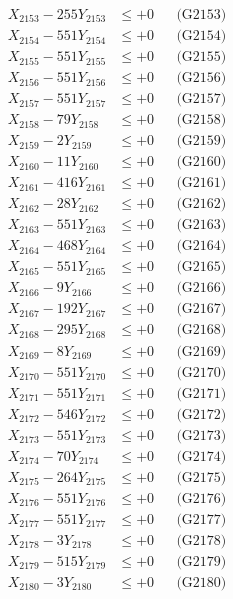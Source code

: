 \documentclass[a4paper,10pt]{article}
\begin{document}
{\begin{align}
X_{2153} - 255Y_{2153} &\leq +0 && \text{(G2153)} \\
X_{2154} - 551Y_{2154} &\leq +0 && \text{(G2154)} \\
X_{2155} - 551Y_{2155} &\leq +0 && \text{(G2155)} \\
X_{2156} - 551Y_{2156} &\leq +0 && \text{(G2156)} \\
X_{2157} - 551Y_{2157} &\leq +0 && \text{(G2157)} \\
X_{2158} - 79Y_{2158} &\leq +0 && \text{(G2158)} \\
X_{2159} - 2Y_{2159} &\leq +0 && \text{(G2159)} \\
X_{2160} - 11Y_{2160} &\leq +0 && \text{(G2160)} \\
\allowbreak
X_{2161} - 416Y_{2161} &\leq +0 && \text{(G2161)} \\
X_{2162} - 28Y_{2162} &\leq +0 && \text{(G2162)} \\
X_{2163} - 551Y_{2163} &\leq +0 && \text{(G2163)} \\
X_{2164} - 468Y_{2164} &\leq +0 && \text{(G2164)} \\
X_{2165} - 551Y_{2165} &\leq +0 && \text{(G2165)} \\
X_{2166} - 9Y_{2166} &\leq +0 && \text{(G2166)} \\
X_{2167} - 192Y_{2167} &\leq +0 && \text{(G2167)} \\
X_{2168} - 295Y_{2168} &\leq +0 && \text{(G2168)} \\
X_{2169} - 8Y_{2169} &\leq +0 && \text{(G2169)} \\
X_{2170} - 551Y_{2170} &\leq +0 && \text{(G2170)} \\
\allowbreak
X_{2171} - 551Y_{2171} &\leq +0 && \text{(G2171)} \\
X_{2172} - 546Y_{2172} &\leq +0 && \text{(G2172)} \\
X_{2173} - 551Y_{2173} &\leq +0 && \text{(G2173)} \\
X_{2174} - 70Y_{2174} &\leq +0 && \text{(G2174)} \\
X_{2175} - 264Y_{2175} &\leq +0 && \text{(G2175)} \\
X_{2176} - 551Y_{2176} &\leq +0 && \text{(G2176)} \\
X_{2177} - 551Y_{2177} &\leq +0 && \text{(G2177)} \\
X_{2178} - 3Y_{2178} &\leq +0 && \text{(G2178)} \\
X_{2179} - 515Y_{2179} &\leq +0 && \text{(G2179)} \\
X_{2180} - 3Y_{2180} &\leq +0 && \text{(G2180)} \\

\end{align}}
\end{document}
